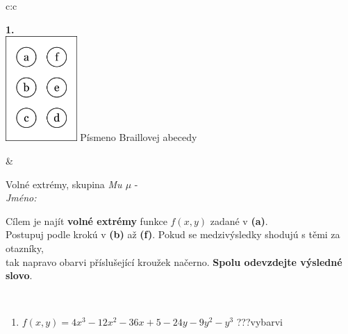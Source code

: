\documentclass[10pt]{report}
\begin{document}
\begin{tabular}{c:c}
\begin{minipage}[c][104.5mm][t]{0.5\linewidth}
\begin{center}
\begin{minipage}{0.79\linewidth}
\begin{center}
\begin{varwidth}{\linewidth}
\begin{enumerate}
\end{enumerate}
\end{varwidth}
\end{center}
\end{minipage}
\begin{minipage}{0.20\linewidth}
\begin{center}
{\Huge\bfseries 1.} \\[2mm]
\includegraphics[height=40mm]{../images/braille.png}
{\small Písmeno Braillovej abecedy}
\end{center}
\end{minipage}
\end{center}
\end{minipage}
&
\begin{minipage}[c][104.5mm][t]{0.5\linewidth}
\begin{center}
\vspace{7mm}
{\huge Volné extrémy, skupina \textit{Mu $\mu$} -}\\[5mm]
\textit{Jméno:}\phantom{xxxxxxxxxxxxxxxxxxxxxxxxxxxxxxxxxxxxxxxxxxxxxxxxxxxxxxxxxxxxxxxxx}\\[5mm]
\begin{minipage}{0.95\linewidth}
\begin{center}
Cílem je najít \textbf{volné extrémy} funkce $f(x,y)$ zadané v \textbf{(a)}.\\Postupuj podle krokú v \textbf{(b)} až \textbf{(f)}. Pokud se medzivýsledky shodujú s těmi za otazníky,\\tak napravo obarvi příslušející kroužek načerno. \textbf{Spolu odevzdejte výsledné slovo}.
\end{center}
\end{minipage}
\\[1mm]
\begin{minipage}{0.79\linewidth}
\begin{center}
\begin{varwidth}{\linewidth}
\begin{enumerate}
\normalsize
\item $f(x,y)=4x^3-12x^2-36x+5-24y-9y^2-y^3$\quad \dotfill\; ???\;\dotfill \quad vybarvi

\end{enumerate}
\end{varwidth}
\end{center}
\end{minipage}
\end{center}
\end{minipage}
\end{tabular}
\end{document}
